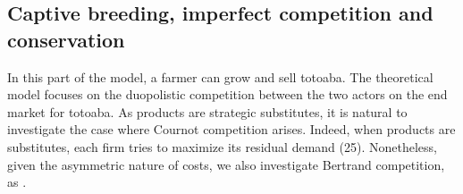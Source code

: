 
\subsection{Captive breeding, imperfect competition and conservation}
In this part of the model, a farmer can grow and sell totoaba. The theoretical model focuses on the duopolistic competition between the two actors on the end market for totoaba. As products are strategic substitutes, it is natural to investigate the case where Cournot competition arises. Indeed, when products are substitutes, each firm tries to maximize its residual demand (25). Nonetheless, given the asymmetric nature of costs, we also investigate Bertrand competition, as \cite{damania_economics_2007}.

